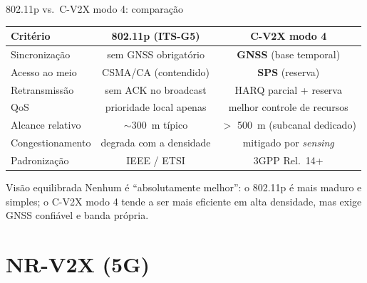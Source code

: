 \documentclass[aspectratio=169,11pt]{beamer}
\begin{document}
\begin{frame}{802.11p vs.\ C-V2X modo 4: comparação}
  \begin{center}
    \begin{tabular}{@{}lcc@{}}
      \toprule
      Critério & 802.11p (ITS-G5) & C-V2X modo 4\\
      \midrule
      Sincronização & sem GNSS obrigatório & \textbf{GNSS} (base temporal) \\
      Acesso ao meio & CSMA/CA (contendido) & \textbf{SPS} (reserva) \\
      Retransmissão & sem ACK no broadcast & HARQ parcial + reserva \\
      QoS & prioridade local apenas & melhor controle de recursos \\
      Alcance relativo & $\sim$300~m típico & $>$ 500~m (subcanal dedicado) \\
      Congestionamento & degrada com a densidade & mitigado por \emph{sensing} \\
      Padronização & IEEE / ETSI & 3GPP Rel.~14+ \\
      \bottomrule
    \end{tabular}
  \end{center}
  \begin{exampleblock}{Visão equilibrada}
    Nenhum é ``absolutamente melhor'': o 802.11p é mais maduro e simples; o C-V2X modo 4 tende a ser mais eficiente em alta densidade, mas exige GNSS confiável e banda própria.
  \end{exampleblock}
\end{frame}

\section{NR-V2X (5G)}
\end{document}

